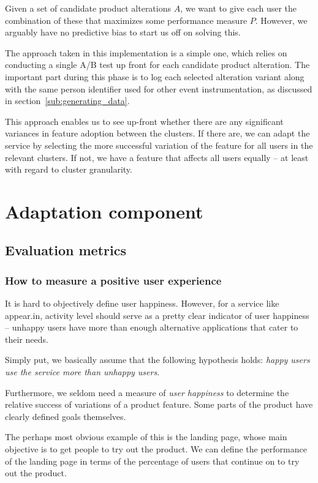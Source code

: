 Given a set of candidate product alterations $A$, we want to give each user the combination of these that maximizes some performance measure $P$. However, we arguably have no predictive bias to start us off on solving this.

The approach taken in this implementation is a simple one, which relies on conducting a single A/B test up front for each candidate product alteration. The important part during this phase is to log each selected alteration variant along with the same person identifier used for other event instrumentation, as discussed in section~\ref{sub:generating_data}.

This approach enables us to see up-front whether there are any significant variances in feature adoption between the clusters. If there are, we can adapt the service by selecting the more successful variation of the feature for all users in the relevant clusters. If not, we have a feature that affects all users equally -- at least with regard to cluster granularity.

\section{Adaptation component} %
\label{sec:adaptation_component}

\subsection{Evaluation metrics} %
\label{sub:evaluation_metrics}

\subsubsection{How to measure a positive user experience} %

It is hard to objectively define user happiness. However, for a service like appear.in, activity level should serve as a pretty clear indicator of user happiness -- unhappy users have more than enough alternative applications that cater to their needs.

Simply put, we basically assume that the following hypothesis holds: \emph{happy users use the service more than unhappy users}.

Furthermore, we seldom need a measure of \emph{user happiness} to determine the relative success of variations of a product feature. Some parts of the product have clearly defined goals themselves.

The perhaps most obvious example of this is the landing page, whose main objective is to get people to try out the product. We can define the performance of the landing page in terms of the percentage of users that continue on to try out the product.

